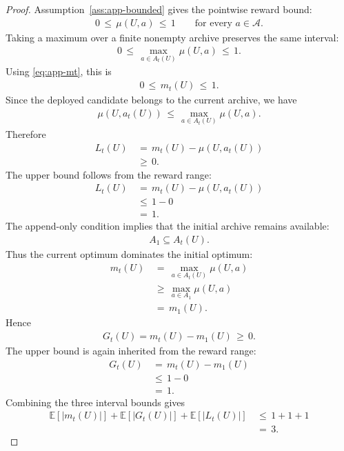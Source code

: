 \documentclass{article} %
\begin{document}
\begin{proof}
Assumption~\ref{ass:app-bounded} gives the pointwise reward bound:
\begin{align}
\label{eq:app-prop-proof-reward-bound}
0
\,\le\,
\mu(U,a)
\,\le\,
1
\qquad
\text{for every } a\in\mathcal{A}.
\end{align}
Taking a maximum over a finite nonempty archive preserves the same interval:
\begin{align}
\label{eq:app-prop-proof-m-bound}
0
\,\le\,
\max_{a\in A_t(U)}\mu(U,a)
\,\le\,
1.
\end{align}
Using \eqref{eq:app-mt}, this is
\begin{align}
\label{eq:app-prop-proof-m}
0
\,\le\,
m_t(U)
\,\le\,
1.
\end{align}
Since the deployed candidate belongs to the current archive, we have
\begin{align}
\label{eq:app-prop-proof-action-in-archive}
\mu(U,a_t(U))
\,\le\,
\max_{a\in A_t(U)}\mu(U,a).
\end{align}
Therefore
\begin{align}
\label{eq:app-prop-proof-l-lower}
L_t(U)
&\,=\,
m_t(U)-\mu(U,a_t(U))
\\
&\,\ge\,
0.
\end{align}
The upper bound follows from the reward range:
\begin{align}
\label{eq:app-prop-proof-l-upper}
L_t(U)
&\,=\,
m_t(U)-\mu(U,a_t(U))
\\
&\,\le\,
1-0
\\
&\,=\,
1.
\end{align}
The append-only condition implies that the initial archive remains available:
\begin{align}
\label{eq:app-prop-proof-monotone}
A_1
\subseteq
A_t(U).
\end{align}
Thus the current optimum dominates the initial optimum:
\begin{align}
\label{eq:app-prop-proof-g-lower}
m_t(U)
&\,=\,
\max_{a\in A_t(U)}\mu(U,a)
\\
&\,\ge\,
\max_{a\in A_1}\mu(U,a)
\\
&\,=\,
m_1(U).
\end{align}
Hence
\begin{align}
\label{eq:app-prop-proof-g-nonnegative}
G_t(U)
=
m_t(U)-m_1(U)
\,\ge\,
0.
\end{align}
The upper bound is again inherited from the reward range:
\begin{align}
\label{eq:app-prop-proof-g-upper}
G_t(U)
&\,=\,
m_t(U)-m_1(U)
\\
&\,\le\,
1-0
\\
&\,=\,
1.
\end{align}
Combining the three interval bounds gives
\begin{align}
\label{eq:app-prop-proof-integrable}
\mathbb{E}[|m_t(U)|]+\mathbb{E}[|G_t(U)|]+\mathbb{E}[|L_t(U)|]
&\,\le\,
1+1+1
\\
&\,=\,
3.
\end{align}
\end{proof}
\end{document}
